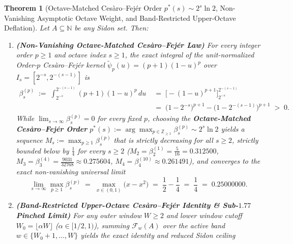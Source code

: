 \documentclass[11pt,reqno]{amsart}
\newtheorem{theorem}{Theorem}[section]
\theoremstyle{definition}
\theoremstyle{remark}
\begin{document}
\begin{theorem}[Octave-Matched Ces\`aro--Fej\'er Order $p^*(s) \sim 2^s \ln 2$, Non-Vanishing Asymptotic Octave Weight, and Band-Restricted Upper-Octave Deflation]\label{thm:octave_matched_band_cesaro}
Let $A \subseteq \mathbb{N}$ be any Sidon set. Then:
\begin{enumerate}
  \item[\textup{(a)}] \textbf{(Non-Vanishing Octave-Matched Ces\`aro--Fej\'er Law)} For every integer order $p \ge 1$ and octave index $s \ge 1$, the exact integral of the unit-normalized Order-$p$ Ces\`aro--Fej\'er kernel $\tilde{\psi}_p(u) = (p + 1)(1 - u)^p$ over $I_s = [2^{-s}, 2^{-(s-1)}]$ is
  \begin{equation}\label{eq:octave_integral_beta_sp}
    \begin{aligned}
      \beta_s^{(p)} \;:=\; \int_{2^{-s}}^{2^{-(s-1)}} (p + 1)(1 - u)^p\,du &\;=\; \bigl[-(1 - u)^{p+1}\bigr]_{2^{-s}}^{2^{-(s-1)}} \\
      &\;=\; \bigl(1 - 2^{-s}\bigr)^{p+1} - \bigl(1 - 2^{-(s-1)}\bigr)^{p+1} \;>\; 0.
    \end{aligned}
  \end{equation}
  While $\lim_{s\to\infty} \beta_s^{(p)} = 0$ for every fixed $p$, choosing the \textbf{Octave-Matched Ces\`aro--Fej\'er Order} $p^*(s) := \arg\max_{p \in \mathbb{Z}_{\ge 1}} \beta_s^{(p)} \sim 2^s \ln 2$ yields a sequence $M_s := \max_{p \ge 1} \beta_s^{(p)}$ that is strictly decreasing for all $s \ge 2$, strictly bounded below by $\frac{1}{4}$ for every $s \ge 2$ ($M_2 = \beta_2^{(1)} = \frac{5}{16} = 0.312500$, $M_3 = \beta_3^{(4)} = \frac{9031}{32768} \approx 0.275604$, $M_4 = \beta_4^{(10)} \approx 0.261491$), and converges to the exact non-vanishing universal limit
  \begin{equation}\label{eq:nonvanishing_octave_limit}
    \lim_{s \to \infty} \max_{p \ge 1} \beta_s^{(p)} \;=\; \max_{x \in (0, 1)} \bigl(x - x^2\bigr) \;=\; \frac{1}{2} - \frac{1}{4} \;=\; \frac{1}{4} \;=\; 0.25000000.
  \end{equation}
  \item[\textup{(b)}] \textbf{(Band-Restricted Upper-Octave Ces\`aro--Fej\'er Identity \& Sub-$1.77$ Pinched Limit)} For any outer window $W \ge 2$ and lower window cutoff $W_0 = \lfloor \alpha W \rfloor$ ($\alpha \in [1/2, 1)$), summing $\mathcal{F}_w(A)$ over the active band $w \in \{W_0 + 1, \dots, W\}$ yields the exact identity and reduced Sidon ceiling
  \begin{equation}\label{eq:band_restricted_cesaro}

\end{equation}
\end{enumerate}
\end{theorem}
\end{document}
